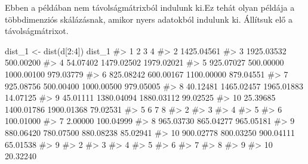 \documentclass[
  letterpaper,
]{krantz}
\makeatletter
\newenvironment{Shaded}{\begin{snugshade}}{\end{snugshade}}
\newcommand{\CommentTok}[1]{\textcolor[rgb]{0.37,0.37,0.37}{#1}}
\newcommand{\DecValTok}[1]{\textcolor[rgb]{0.68,0.00,0.00}{#1}}
\newcommand{\FunctionTok}[1]{\textcolor[rgb]{0.28,0.35,0.67}{#1}}
\newcommand{\NormalTok}[1]{\textcolor[rgb]{0.00,0.23,0.31}{#1}}
\newcommand{\OtherTok}[1]{\textcolor[rgb]{0.00,0.23,0.31}{#1}}
\newcommand{\SpecialCharTok}[1]{\textcolor[rgb]{0.37,0.37,0.37}{#1}}
\newenvironment{kframe}{%
\medskip{}
\setlength{\fboxsep}{.8em}
 \def\at@end@of@kframe{}%
 \ifinner\ifhmode%
  \def\at@end@of@kframe{\end{minipage}}%
  \begin{minipage}{\columnwidth}%
 \fi\fi%
 \def\FrameCommand##1{\hskip\@totalleftmargin \hskip-\fboxsep
 \colorbox{shadecolor}{##1}\hskip-\fboxsep
     \hskip-\linewidth \hskip-\@totalleftmargin \hskip\columnwidth}%
 \MakeFramed {\advance\hsize-\width
   \@totalleftmargin\z@ \linewidth\hsize
   \@setminipage}}%
 {\par\unskip\endMakeFramed%
 \at@end@of@kframe}
\renewenvironment{Shaded}{\begin{kframe}}{\end{kframe}}
\makeatother
\begin{document}
Ebben a példában nem távolságmátrixból indulunk ki.Ez tehát olyan
példája a többdimenziós skálázásnak, amikor nyers adatokból indulunk ki.
Állítsuk elő a távolságmátrixot.

\begin{Shaded}
\begin{Highlighting}[]
\NormalTok{dist\_1 }\OtherTok{\textless{}{-}} \FunctionTok{dist}\NormalTok{(d[}\DecValTok{2}\SpecialCharTok{:}\DecValTok{4}\NormalTok{])}
\NormalTok{dist\_1}
\CommentTok{\#\textgreater{}             1          2          3          4}
\CommentTok{\#\textgreater{} 2  1425.04561                                 }
\CommentTok{\#\textgreater{} 3  1925.03532  500.00200                      }
\CommentTok{\#\textgreater{} 4    54.07402 1479.02502 1979.02021           }
\CommentTok{\#\textgreater{} 5   925.07027  500.00000 1000.00100  979.03779}
\CommentTok{\#\textgreater{} 6   825.08242  600.00167 1100.00000  879.04551}
\CommentTok{\#\textgreater{} 7   925.08756  500.00400 1000.00500  979.05005}
\CommentTok{\#\textgreater{} 8    40.12481 1465.02457 1965.01883   14.07125}
\CommentTok{\#\textgreater{} 9    45.01111 1380.04094 1880.03112   99.02525}
\CommentTok{\#\textgreater{} 10   25.39685 1400.01786 1900.01368   79.02531}
\CommentTok{\#\textgreater{}             5          6          7          8}
\CommentTok{\#\textgreater{} 2                                             }
\CommentTok{\#\textgreater{} 3                                             }
\CommentTok{\#\textgreater{} 4                                             }
\CommentTok{\#\textgreater{} 5                                             }
\CommentTok{\#\textgreater{} 6   100.01000                                 }
\CommentTok{\#\textgreater{} 7     2.00000  100.04999                      }
\CommentTok{\#\textgreater{} 8   965.03730  865.04277  965.05181           }
\CommentTok{\#\textgreater{} 9   880.06420  780.07500  880.08238   85.02941}
\CommentTok{\#\textgreater{} 10  900.02778  800.03250  900.04111   65.01538}
\CommentTok{\#\textgreater{}             9}
\CommentTok{\#\textgreater{} 2            }
\CommentTok{\#\textgreater{} 3            }
\CommentTok{\#\textgreater{} 4            }
\CommentTok{\#\textgreater{} 5            }
\CommentTok{\#\textgreater{} 6            }
\CommentTok{\#\textgreater{} 7            }
\CommentTok{\#\textgreater{} 8            }
\CommentTok{\#\textgreater{} 9            }
\CommentTok{\#\textgreater{} 10   20.32240}
\end{Highlighting}
\end{Shaded}
\end{document}
